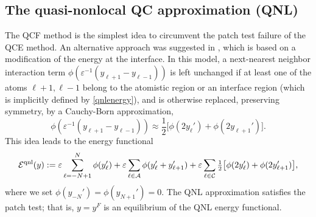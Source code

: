 \documentclass[12pt,reqno]{amsart}
\begin{document}
\subsection{The quasi-nonlocal QC approximation (QNL)}
\label{sec:model:qnl}
The QCF method is the simplest idea to circumvent the patch test
failure of the QCE method. An alternative approach was suggested in
\cite{Shimokawa:2004,E:2006}, which is based on a modification of the
energy at the interface. In this model, a next-nearest neighbor
interaction term $\phi({\varepsilon}^{-1}(y_{\ell+1}-y_{\ell-1}))$ is left
unchanged if at least one of the atoms $\ell+1, \ell-1$ belong to the
atomistic region or an interface region (which is implicitly defined
by \eqref{qnlenergy}), and is otherwise replaced, preserving symmetry,
by a Cauchy-Born approximation,
\begin{displaymath}
  \phi\left({\varepsilon}^{-1}(y_{\ell+1}-y_{\ell-1})\right) \approx
  {{\textstyle \frac{1}{2}}} \big[ \phi(2y_\ell') + \phi(2y_{\ell+1}')].
\end{displaymath}
This idea leads to the energy functional
\begin{equation}\label{qnlenergy}
  \begin{split}
    {{\mathcal{E}}^{{\rm qnl}}}(y) := {\varepsilon} \sum_{\ell = -N+1}^N  \phi(y_\ell')
    + {\varepsilon} \sum_{\ell \in {\mathcal{A}}} \phi(y_\ell' + y_{\ell+1}')
    + {\varepsilon} \sum_{\ell \in {\mathcal{C}}} {{\textstyle \frac{1}{2}}} \big[ \phi(2y_\ell')
    + \phi(2y_{\ell+1}')\big],
  \end{split}
\end{equation}
where we set $\phi(y_{-N}')=\phi(y_{N+1}')=0$. The QNL approximation
satisfies the patch test; that is, $y = y^F$ is an equilibrium of the QNL energy
functional.
\end{document}
